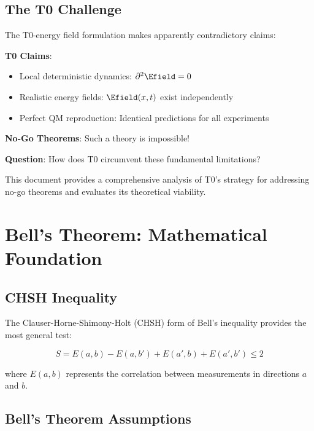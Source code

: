 	\subsection{The T0 Challenge}
	
	The T0-energy field formulation makes apparently contradictory claims:
	
	\begin{tcolorbox}[colback=red!5!white,colframe=red!75!black,title=T0 Claims vs No-Go Theorems]
		\textbf{T0 Claims}:
		\begin{itemize}
			\item Local deterministic dynamics: $\partial^2 \Efield = 0$
			\item Realistic energy fields: $\Efield(x,t)$ exist independently
			\item Perfect QM reproduction: Identical predictions for all experiments
		\end{itemize}
		
		\textbf{No-Go Theorems}: Such a theory is impossible!
		
		\textbf{Question}: How does T0 circumvent these fundamental limitations?
	\end{tcolorbox}
	
	This document provides a comprehensive analysis of T0's strategy for addressing no-go theorems and evaluates its theoretical viability.
	
	\section{Bell's Theorem: Mathematical Foundation}
	
	\subsection{CHSH Inequality}
	
	The Clauser-Horne-Shimony-Holt (CHSH) form of Bell's inequality provides the most general test:
	
	\begin{equation}
		S = E(a,b) - E(a,b') + E(a',b) + E(a',b') \leq 2
		\label{eq:chsh_inequality}
	\end{equation}
	
	where $E(a,b)$ represents the correlation between measurements in directions $a$ and $b$.
	
	\subsection{Bell's Theorem Assumptions}
	
